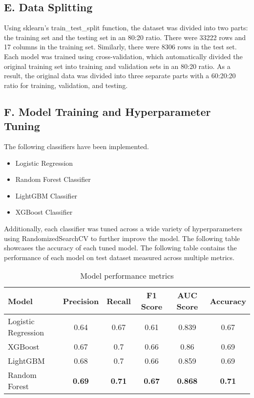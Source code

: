 \documentclass[conference]{IEEEtran}
\begin{document}
\subsection*{\centering E. Data Splitting}
Using sklearn's train\_test\_split function, the dataset was divided into two parts: the training set and the testing set in an 80:20 ratio. There were 33222 rows and 17 columns in the training set. Similarly, there were 8306 rows in the test set. Each model was trained using cross-validation, which automatically divided the original training set into training and validation sets in an 80:20 ratio. As a result, the original data was divided into three separate parts with a 60:20:20 ratio for training, validation, and testing. \newline


\subsection*{\centering F. Model Training and Hyperparameter Tuning}
The following classifiers have been implemented.

\begin{itemize}

\item 	Logistic Regression
\item 	Random Forest Classifier
\item 	LightGBM Classifier
\item 	XGBoost Classifier \newline
\end{itemize}


Additionally, each classifier was tuned across a wide variety of hyperparameters using RandomizedSearchCV to further improve the model. The following table showcases the accuracy of each tuned model. The following table contains the performance of each model on test dataset measured across multiple metrics. 

\begin{table}[H]
    \centering
    \setlength{\tabcolsep}{2.9pt}
    \renewcommand{\arraystretch}{2.5}
    \begin{tabular}{|l|c|c|c|c|c|}
    \hline
        Model & Precision & Recall & F1 Score & AUC Score & Accuracy \\ \hline
        Logistic Regression & 0.64 & 0.67 & 0.61 & 0.839 & 0.67 \\ \hline
        XGBoost & 0.67 & 0.7 & 0.66 & 0.86 & 0.69 \\ \hline
        LightGBM & 0.68 & 0.7 & 0.66 & 0.859 & 0.69 \\ \hline
        Random Forest & \textbf{0.69} & \textbf{0.71} & \textbf{0.67} & \textbf{0.868} & \textbf{0.71} \\ \hline
    \end{tabular}
    \vspace{10pt} %
    \caption{Model performance metrics}
\end{table}
\end{document}
